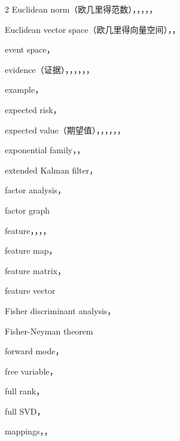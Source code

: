 \begin{multicols}{2}
\noindent Euclidean norm（欧几里得范数），，，，，\par
\noindent Euclidean vector space（欧几里得向量空间），，\par
\noindent event space，\par
\noindent evidence（证据），，，，，，\par
\noindent example，\par
\noindent expected risk，\par
\noindent expected value（期望值），，，，，，\par
\noindent exponential family，，\par
\noindent extended Kalman filter，\par

\medskip{}\par\smallskip
\noindent factor analysis，\par
\noindent factor graph\par
\noindent feature，，，，\par
\noindent feature map，\par
\noindent feature matrix，\par
\noindent feature vector\par
\noindent Fisher discriminant analysis，\par
\noindent Fisher-Neyman theorem\par
\noindent forward mode，\par
\noindent free variable，\par
\noindent full rank，\par
\noindent full SVD，\par

\medskip{}\par\smallskip
\noindent mappings，，\par


\end{multicols}
